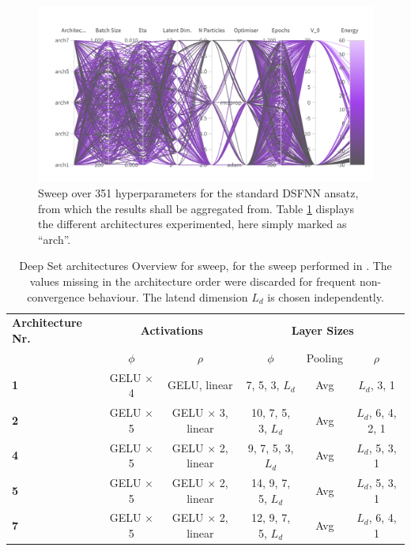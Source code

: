 \begin{figure}[H]
    \centering
    \includegraphics[width=0.8\linewidth]{Chapters/Results/N2/deepset_sweep.png}
    \caption{Sweep over 351 hyperparameters for the standard DSFNN ansatz, from which the results shall be aggregated from. Table \ref{tab:arch} displays the different architectures experimented, here simply marked as ``arch''.}
    \label{fig:ds_complete_sweep}
\end{figure}

\begin{table}[h!]
\centering
\caption{Deep Set architectures Overview for sweep, for the sweep performed in . The values missing in the architecture order were discarded for frequent non-convergence behaviour. The latend dimension $L_d$ is chosen independently.}
\label{tab:arch}
\begin{tabular}{@{}lccccc@{}}
\toprule
\textbf{Architecture Nr.} & \multicolumn{2}{c}{\textbf{Activations}} & \multicolumn{3}{c}{\textbf{Layer Sizes}} \\ 
\cmidrule(lr){2-3} \cmidrule(lr){4-6}
 & $\phi$ & $\rho$ & $\phi$ & Pooling & $\rho$ \\ 
\midrule
\textbf{1} & GELU $\times$ 4 & GELU, linear & 7, 5, 3, $L_d$ & Avg & $L_d$, 3, 1 \\ 
\textbf{2} & GELU $\times$ 5 & GELU $\times$ 3, linear & 10, 7, 5, 3, $L_d$ & Avg & $L_d$, 6, 4, 2, 1 \\ 
\textbf{4} & GELU $\times$ 5 & GELU $\times$ 2, linear & 9, 7, 5, 3, $L_d$ & Avg & $L_d$, 5, 3, 1 \\ 
\textbf{5} & GELU $\times$ 5 & GELU $\times$ 2, linear & 14, 9, 7, 5, $L_d$ & Avg & $L_d$, 5, 3, 1 \\ 
\textbf{7} & GELU $\times$ 5 & GELU $\times$ 2, linear & 12, 9, 7, 5, $L_d$ & Avg & $L_d$, 6, 4, 1 \\ 
\bottomrule
\end{tabular}
\end{table}


